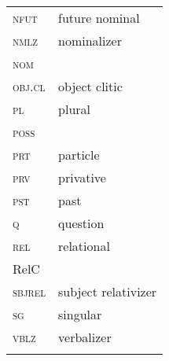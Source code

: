 \documentclass[output=paper]{LSP/langsci}
\begin{document}
\begin{tabularx}{.45\textwidth}{lQ}
\textsc{nfut} &  future nominal  \\
\textsc{nmlz} &  nominalizer   \\
\textsc{nom} &      \\
\textsc{obj.cl} &  object clitic   \\
\textsc{pl} &  plural       \\
\textsc{poss} &      \\
\textsc{prt} &  particle      \\
\textsc{prv} &  privative     \\
\textsc{pst} &  past       \\
\textsc{q} &  question    \\
\textsc{rel} &  relational     \\
RelC &        \\ 
\textsc{sbjrel} &  subject relativizer\\
\textsc{sg} &  singular      \\
\textsc{vblz} &  verbalizer    \\
\\
\end{tabularx}






{\sloppy
\printbibliography[heading=subbibliography,notkeyword=this]
}
\end{document}
